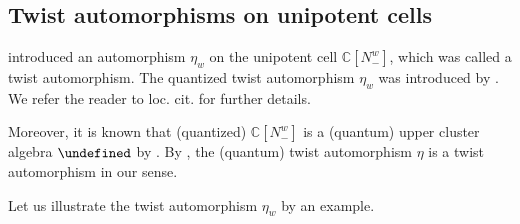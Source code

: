 \documentclass[10pt,a4paper]{amsart}
\newcommand{\C}{\mathbb{C}}
\let\upClAlg\undefined
\newcommand{\upClAlg}{\mathcal{U}^A}
\numberwithin{equation}{section}
\begin{document}
\subsection{Twist automorphisms on unipotent cells}
\cite{BerensteinFominZelevinsky96,berenstein1997total} introduced
an automorphism $\eta_{w}$ on the unipotent cell $\C[N_{-}^{w}]$,
which was called a twist automorphism. The quantized twist automorphism
$\eta_{w}$ was introduced by \cite{kimura2017twist}. We refer the
reader to loc. cit. for further details.

Moreover, it is known that (quantized) $\C[N_{-}^{w}]$ is a (quantum)
upper cluster algebra $\upClAlg$ by \cite{GeissLeclercSchroeer10,GeissLeclercSchroeer11,GY13,goodearl2020integral}. By \cite{qin2020dual}, the (quantum)
twist automorphism $\eta$ is a twist automorphism in our sense.

Let us illustrate the twist automorphism $\eta_{w}$ by an example.
\end{document}
